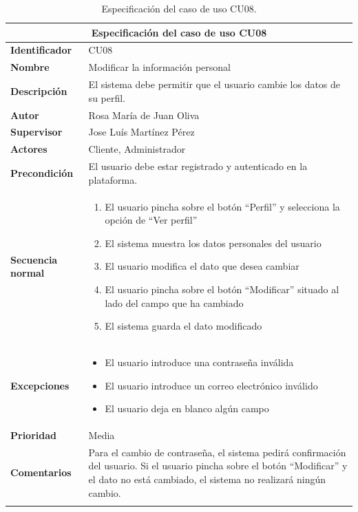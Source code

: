 \documentclass[pdftex,11pt,a4paper]{book}
\begin{document}

\renewcommand{\tablename}{Tabla}
\renewcommand{\arraystretch}{1,7}

\begin{center}
\begin{longtable}{|m{}|m{11cm}|}
\hline
\multicolumn{2}{|c|}{\textbf{Especificación del caso de uso CU08}}\\
\hline 
\endhead

\textbf{Identificador} & CU08  
\\ \hline
\textbf{Nombre} & Modificar la información personal 
\\ \hline
\textbf{Descripción} & El sistema debe permitir que el usuario cambie los datos de su perfil.
\\ \hline
\textbf{Autor} & Rosa María de Juan Oliva 
\\ \hline
\textbf{Supervisor} & Jose Luís Martínez Pérez  
\\ \hline
\textbf{Actores} & Cliente, Administrador 
\\ \hline
\textbf{Precondición} & El usuario debe estar registrado y autenticado en la plataforma.
\\ \hline
\textbf{Secuencia normal} & 
\begin{enumerate}
\addtolength{\itemsep}{-3mm}
\item El usuario pincha sobre el botón “Perfil” y selecciona la opción de “Ver perfil”
\item El sistema muestra los datos personales del usuario
\item El usuario modifica el dato que desea cambiar
\item El usuario pincha sobre el botón “Modificar” situado al lado del campo que ha cambiado
\item El sistema guarda el dato modificado
\end{enumerate}
\\ \hline
\textbf{Excepciones} &
\begin{itemize}
\addtolength{\itemsep}{-3mm}
\item El usuario introduce una contraseña inválida
\item El usuario introduce un correo electrónico inválido
\item El usuario deja en blanco algún campo
\end{itemize}
\\ \hline
\textbf{Prioridad} & Media
\\ \hline
\textbf{Comentarios} & Para el cambio de contraseña, el sistema pedirá confirmación del usuario. Si el usuario pincha sobre el botón “Modificar” y el dato no está cambiado, el sistema no realizará ningún cambio.
\\ \hline

\caption{Especificación del caso de uso CU08.} \label{tablalarga:tablaCU08}
\end{longtable}
\end{center}
\end{document}

